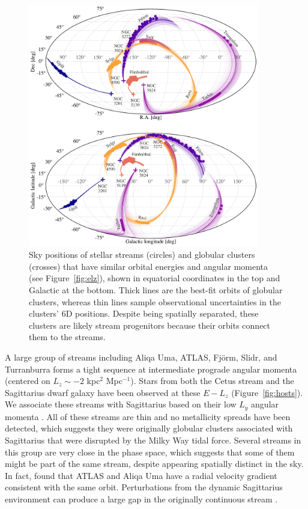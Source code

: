 \documentclass[twocolumn]{aastex63}
\begin{document}
\begin{figure}
\begin{center}
\includegraphics[width=0.9\textwidth]{sky_orbits.pdf}
\end{center}
\caption{
Sky positions of stellar streams (circles) and globular clusters (crosses) that have similar orbital energies and angular momenta (see Figure~\ref{fig:elz}), shown in equatorial coordinates in the top and Galactic at the bottom.
Thick lines are the best-fit orbits of globular clusters, whereas thin lines sample observational uncertainties in the clusters' 6D positions.
Despite being spatially separated, these clusters are likely stream progenitors because their orbits connect them to the streams.
}
\label{fig:sky}
\end{figure}

A large group of streams including Aliqa Uma, ATLAS, Fj\" orm, Slidr, and Turranburra forms a tight sequence at intermediate prograde angular momenta (centered on $L_z\sim-2$ kpc$^2$ Mpc$^{-1}$).
Stars from both the Cetus stream and the Sagittarius dwarf galaxy have been observed at these $E-L_z$ (Figure~\ref{fig:hosts}).
We associate these streams with Sagittarius based on their low $L_y$ angular momenta \citep{Johnson2020}.
All of these streams are thin and no metallicity spreads have been detected, which suggests they were originally globular clusters associated with Sagittarius that were disrupted by the Milky Way tidal force.
Several streams in this group are very close in the phase space, which suggests that some of them might be part of the same stream, despite appearing spatially distinct in the sky.
In fact, \citet{li2020} found that ATLAS and Aliqa Uma have a radial velocity gradient consistent with the same orbit.
Perturbations from the dynamic Sagittarius environment can produce a large gap in the originally continuous stream \citep{bonaca2020b, deboer2020}.
\end{document}
